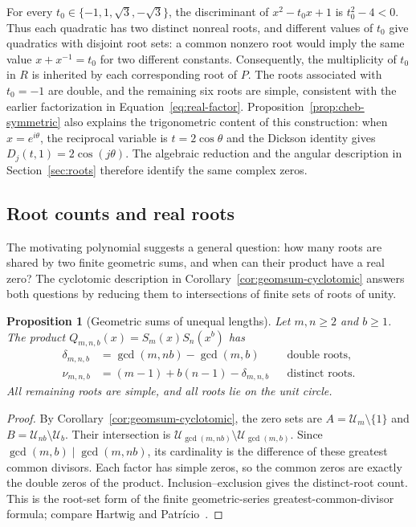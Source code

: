 \documentclass[11pt,a4paper]{article}
\numberwithin{equation}{section}
\theoremstyle{uprightpaper}
\newtheorem{proposition}{Proposition}[section]
\begin{document}
For every $t_0\in\{-1,1,\sqrt3,-\sqrt3\}$, the discriminant of $x^2-t_0x+1$ is $t_0^2-4<0$. Thus each quadratic has two distinct nonreal roots, and different values of $t_0$ give quadratics with disjoint root sets: a common nonzero root would imply the same value $x+x^{-1}=t_0$ for two different constants. Consequently, the multiplicity of $t_0$ in $R$ is inherited by each corresponding root of $P$. The roots associated with $t_0=-1$ are double, and the remaining six roots are simple, consistent with the earlier factorization in Equation~\eqref{eq:real-factor}. Proposition~\ref{prop:cheb-symmetric} also explains the trigonometric content of this construction: when $x=e^{i\theta}$, the reciprocal variable is $t=2\cos\theta$ and the Dickson identity gives $D_j(t,1)=2\cos(j\theta)$. The algebraic reduction and the angular description in Section~\ref{sec:roots} therefore identify the same complex zeros.

\subsection{Root counts and real roots}\label{sec:realexamples}

The motivating polynomial suggests a general question: how many roots are shared by two finite geometric sums, and when can their product have a real zero? The cyclotomic description in Corollary~\ref{cor:geomsum-cyclotomic} answers both questions by reducing them to intersections of finite sets of roots of unity.

\begin{proposition}[Geometric sums of unequal lengths]\label{prop:application-unequal}
Let $m,n\ge2$ and $b\ge1$. The product $Q_{m,n,b}(x)=S_m(x)S_n(x^b)$ has
\begin{subequations}\label{eq:unequal-counts}
\begin{align}
 \delta_{m,n,b}&=\gcd(m,nb)-\gcd(m,b) &&\text{double roots},\label{eq:unequal-double}\\
 \nu_{m,n,b}&=(m-1)+b(n-1)-\delta_{m,n,b} &&\text{distinct roots}.\label{eq:unequal-distinct}
\end{align}
\end{subequations}
All remaining roots are simple, and all roots lie on the unit circle.
\end{proposition}
\begin{proof}
By Corollary~\ref{cor:geomsum-cyclotomic}, the zero sets are $A=\mathcal U_m\setminus\{1\}$ and $B=\mathcal U_{nb}\setminus\mathcal U_b$. Their intersection is $\mathcal U_{\gcd(m,nb)}\setminus\mathcal U_{\gcd(m,b)}$. Since $\gcd(m,b)\mid\gcd(m,nb)$, its cardinality is the difference of these greatest common divisors. Each factor has simple zeros, so the common zeros are exactly the double zeros of the product. Inclusion--exclusion gives the distinct-root count. This is the root-set form of the finite geometric-series greatest-common-divisor formula; compare Hartwig and Patr\'icio~\cite[Lemma~3.3, p.~9976; Theorem~3.4, p.~9977]{hartwig2023gcd}.
\end{proof}
\end{document}
